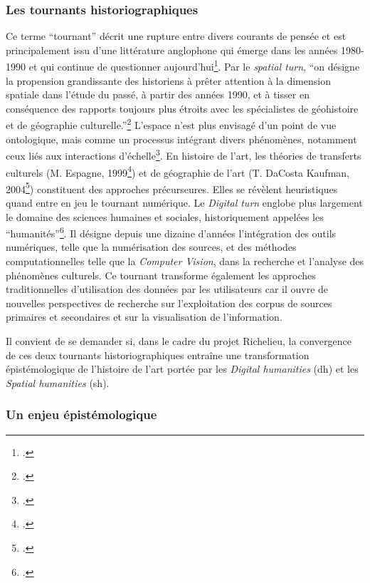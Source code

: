 \subsubsection{Les tournants historiographiques} 
Ce terme \enquote{tournant} décrit une rupture entre divers courants de pensée et est principalement issu d'une littérature anglophone qui émerge dans les années 1980-1990 et qui continue de questionner aujourd'hui\footcite{CLAVALgeographie2008, CLAVALOu2008, DOMINICLARAMEEtournants2017, Humanites}. Par le \textit{spatial turn}, \enquote{on désigne la propension grandissante des historiens à prêter attention à la dimension spatiale dans l’étude du passé, à partir des années 1990, et à tisser en conséquence des rapports toujours plus étroits avec les spécialistes de géohistoire et de géographie culturelle.}\footcite{TORREtournant2008} L'espace n'est plus envisagé d'un point de vue ontologique, mais comme un processus intégrant divers phénomènes, notamment ceux liés aux interactions d'échelle\footcite{BESSEApproches2010}. En histoire de l'art, les théories de transferts culturels (M. Espagne, 1999\footcite{ESPAGNEnotion2013}) et de géographie de l'art (T. DaCosta Kaufman, 2004\footcite{KAUFMANNGeography2004}) constituent des approches précurseures. Elles se révèlent heuristiques quand entre en jeu le tournant numérique. Le \textit{Digital turn} englobe plus largement le domaine des sciences humaines et sociales, historiquement appelées les \enquote{humanités}\footcite{MOUNIERhumanites2018, SAINT-RAYMONDDans2024}. Il désigne depuis une dizaine d'années l'intégration des outils numériques, telle que la numérisation des sources, et des méthodes computationnelles telle que la \textit{Computer Vision}, dans la recherche et l'analyse des phénomènes culturels. Ce tournant transforme également les approches traditionnelles d'utilisation des données par les utilisateurs car il ouvre de nouvelles perspectives de recherche sur l'exploitation des corpus de sources primaires et secondaires et sur la visualisation de l'information. 

Il convient de se demander si, dans le cadre du projet Richelieu, la convergence de ces deux tournants historiographiques entraîne une transformation épistémologique de l'histoire de l'art portée par les \textit{Digital humanities} (\acrshort{dh}) et les \textit{Spatial humanities} (\acrshort{sh}).

\subsubsection{Un enjeu épistémologique}

